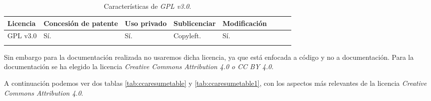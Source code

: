 \begin{longtable}[]{@{}llllllll@{}} 
\toprule 
\begin{minipage}[b]{0.15\columnwidth}\raggedright\strut
Licencia\strut
\end{minipage} & \begin{minipage}[b]{0.18\columnwidth}\raggedright\strut
Concesión de patente\strut
\end{minipage} & \begin{minipage}[b]{0.17\columnwidth}\raggedright\strut
Uso privado\strut
\end{minipage} & \begin{minipage}[b]{0.15\columnwidth}\raggedright\strut
Sublicenciar\strut
\end{minipage} & \begin{minipage}[b]{0.17\columnwidth}\raggedright\strut
Modificación\strut
\end{minipage}\tabularnewline
\midrule
\endhead
\begin{minipage}[t]{0.15\columnwidth}\raggedright\strut
GPL v3.0\strut
\end{minipage} & \begin{minipage}[t]{0.18\columnwidth}\raggedright\strut
Sí.\strut
\end{minipage} & \begin{minipage}[t]{0.17\columnwidth}\raggedright\strut
Sí.\strut
\end{minipage} & \begin{minipage}[t]{0.15\columnwidth}\raggedright\strut
Copyleft.\strut
\end{minipage} & \begin{minipage}[t]{0.17\columnwidth}\raggedright\strut
Sí.\strut
\end{minipage}\tabularnewline
\bottomrule
\caption{Características de \textit{GPL v3.0}.}
\label{gnuresumetable1}
\end{longtable}

Sin embargo para la documentación realizada no usaremos dicha licencia, ya que está enfocada a código y no a documentación. 
Para la documentación se ha elegido la licencia \textit{Creative Commons Attribution 4.0 o CC BY 4.0}.

A continuación podemos ver dos tablas \ref{tab:ccaresumetable} y \ref{tab:ccaresumetable1}, con los aspectos más relevantes de la licencia \textit{Creative Commons Attribution 4.0}.

